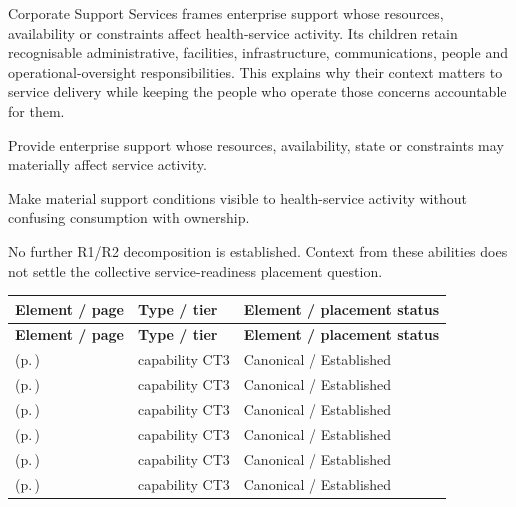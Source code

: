 Corporate Support Services frames enterprise support whose resources, availability or constraints affect health-service activity. Its children retain recognisable administrative, facilities, infrastructure, communications, people and operational-oversight responsibilities. This explains why their context matters to service delivery while keeping the people who operate those concerns accountable for them.



Provide enterprise support whose resources, availability, state or constraints may materially affect service activity.



Make material support conditions visible to health-service activity without confusing consumption with ownership.



No further R1/\allowbreak{}R2 decomposition is established. Context from these abilities does not settle the collective service-readiness placement question.


\begingroup\small\setlength{\TableWidth}{\dimexpr\linewidth-6\tabcolsep-4\arrayrulewidth\relax}
\begin{longtable}{|>{\raggedright\arraybackslash}p{0.52\TableWidth}|>{\raggedright\arraybackslash}p{0.2\TableWidth}|>{\raggedright\arraybackslash}p{0.28\TableWidth}|}
\hline\rowcolor{TableHead}\textbf{Element / page} & \textbf{Type / tier} & \textbf{Element / placement status}\\\hline\endfirsthead
\hline\rowcolor{TableHead}\textbf{Element / page} & \textbf{Type / tier} & \textbf{Element / placement status}\\\hline\endhead
\hline\endfoot
\nameref{cap:bc-back-office-services} (p.\,\pageref{cap:bc-back-office-services}) & capability CT3 & Canonical / Established\\\hline
\nameref{cap:bc-facilities-management} (p.\,\pageref{cap:bc-facilities-management}) & capability CT3 & Canonical / Established\\\hline
\nameref{cap:bc-it-infrastructure-management} (p.\,\pageref{cap:bc-it-infrastructure-management}) & capability CT3 & Canonical / Established\\\hline
\nameref{cap:bc-communications-publicity} (p.\,\pageref{cap:bc-communications-publicity}) & capability CT3 & Canonical / Established\\\hline
\nameref{cap:bc-people-management} (p.\,\pageref{cap:bc-people-management}) & capability CT3 & Canonical / Established\\\hline
\nameref{cap:bc-operational-oversight} (p.\,\pageref{cap:bc-operational-oversight}) & capability CT3 & Canonical / Established\\\hline
\end{longtable}\endgroup

